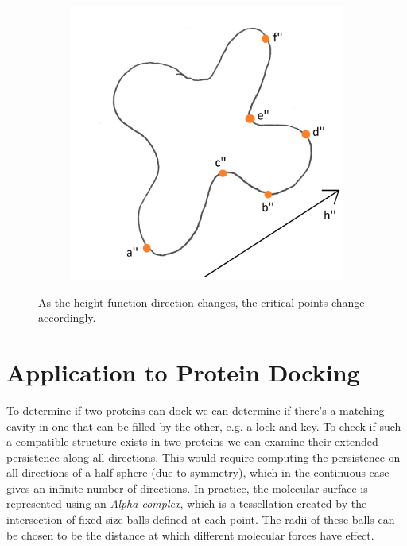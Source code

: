 \documentclass{article}
\begin{document}
\begin{figure}
\begin{subfigure}{0.32\columnwidth}
	\end{subfigure}
	\begin{subfigure}{0.32\columnwidth}
		\centering
		\includegraphics[width=\textwidth]{fig/blobby-molecule-h-diagonal}
	\end{subfigure}
	\caption{\label{fig:elevations} As the height function direction changes, the
	critical points change accordingly.}
\end{figure}

\section{Application to Protein Docking}

To determine if two proteins can dock we can determine if there's a matching cavity in one that
can be filled by the other, e.g. a lock and key. To check if such a compatible structure exists
in two proteins we can examine their extended persistence along all directions. This would
require computing the persistence on all directions of a half-sphere (due to symmetry), which in the
continuous case gives an infinite number of directions. In practice, the molecular surface
is represented using an \emph{Alpha complex}, which is a tessellation created by the intersection
of fixed size balls defined at each point. The radii of these balls can be chosen to be the
distance at which different molecular forces have effect.
\end{document}
